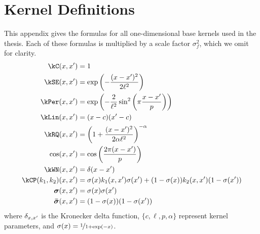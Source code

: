 \chapter{Kernel Definitions}
\label{sec:kernel-definitions}

\newcommand{\scalefactor}{}

This appendix gives the formulas for all one-dimensional base kernels used in the thesis.
Each of these formulas is multiplied by a scale factor $\sigma_f^2$, which we omit for clarity.
%
\begin{align}
\kC(\inputVar, \inputVar') & = \scalefactor 1 \\
\kSE(\inputVar, \inputVar') & = \scalefactor \exp\left(-\frac{(\inputVar - \inputVar')^2}{2\ell^2}\right)  \label{eq:appendix-se}\\
\kPer(x, x') & = \exp\left(-\frac{2}{\ell^2} \sin^2 \left( \pi \frac{\inputVar - \inputVar'}{p} \right)\right) \label{eq:appendix-periodic}\\
\kLin(\inputVar, \inputVar') & = \scalefactor (\inputVar - c)(\inputVar' - c)  \label{eq:appendix-lin} \\
\kRQ(x, x') & = \scalefactor \left( 1 + \frac{(\inputVar - \inputVar')^2}{2\alpha\ell^2}\right)^{-\alpha}  \label{eq:appendix-rq}\\
\cos(x, x') & = \scalefactor \cos\left(\frac{2 \pi (x - x')}{p}\right) \label{eq:appendix-cos} \\
\kWN(\inputVar, \inputVar') & = \scalefactor \delta(\inputVar - \inputVar') \label{eq:appendix-wn}\\
\kCP(\kernel_1, \kernel_2)(x, x') & = \scalefactor \sigma(x) k_1(x,x')\sigma(x') + (1-\sigma(x)) k_2(x,x')(1-\sigma(x')) \\
\boldsymbol\sigma(\inputVar, \inputVar') & = \scalefactor \sigma(x)\sigma(x') \\
\boldsymbol{\bar\sigma}(\inputVar, \inputVar') & = \scalefactor (1-\sigma(x))(1-\sigma(x'))
\end{align}
%
where $\delta_{x, x'}$ is the Kronecker delta function, $\{c,\ell,p,\alpha\}$ represent kernel parameters, and ${\sigma(x) = \nicefrac{1}{1 + \exp(-x)}}$.

